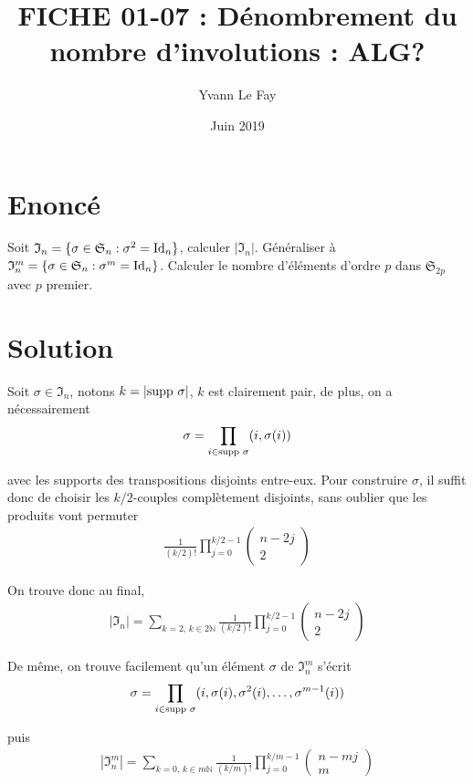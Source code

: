 \documentclass{article}
\begin{document}
\title{FICHE 01-07 : Dénombrement du nombre d'involutions : ALG?}
\author{Yvann Le Fay}
\date{Juin 2019}
\maketitle
\section*{Enoncé}
Soit $\mathfrak{I}_n = \{\sigma\in \mathfrak{S}_n : \sigma^2 = \textup{Id}_n\}$, calculer $|\mathfrak{I}_n|$. Généraliser à $\mathfrak{I}_n^m = \{\sigma \in\mathfrak{S}_n : \sigma^m = \textup{Id}_n\}$. Calculer le nombre d'éléments d'ordre $p$ dans $\mathfrak{S}_{2p}$ avec $p$ premier.
\section*{Solution}
Soit $\sigma\in\mathfrak{I}_n$, notons $k=|\textup{supp }\sigma|$, $k$ est clairement pair, de plus, on a nécessairement
\begin{align*}
\sigma = \prod_{i \in \textup{supp }\sigma}(i,\sigma(i))
\end{align*}

avec les supports des transpositions disjoints entre-eux. Pour construire $\sigma$, il suffit donc de choisir les $k/2$-couples complètement disjoints, sans oublier que les produits vont permuter
\begin{align*}
\frac{1}{(k/2)!}\prod_{j=0}^{k/2-1}\begin{pmatrix}
n-2j\\2
\end{pmatrix}
\end{align*}

On trouve donc au final,
\begin{align*}
|\mathfrak{I}_n| = \sum_{k=2, \, k \in 2\mathbb{N}}\frac{1}{(k/2)!}\prod_{j=0}^{k/2-1}\begin{pmatrix}n-2j\\2\end{pmatrix}
\end{align*}


De même, on trouve facilement qu'un élément $\sigma$ de $\mathfrak{I}_n^m$ s'écrit
\begin{align*}
\sigma = \prod_{i\in \textup{supp }\sigma}(i,\sigma(i), \sigma^2(i),\ldots,\sigma^{m-1}(i))
\end{align*}

puis
\begin{align*}
|\mathfrak{I}_n^m|= \sum_{k=0,\, k\in m\mathbb{N}}\frac{1}{(k/m)!}\prod_{j=0}^{k/m-1}\begin{pmatrix}n-mj\\m\end{pmatrix}
\end{align*}
\end{document}
